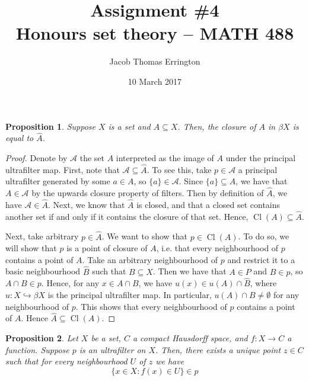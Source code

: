 \documentclass[11pt,letterpaper]{article}
\author{Jacob Thomas Errington}
\title{Assignment \#4\\Honours set theory -- MATH 488}
\date{10 March 2017}
\newtheorem{prop}{Proposition}
\newcommand{\parens}[1]{\left(#1\right)}
\newcommand{\intersn}{\cap}
\DeclareMathOperator{\closureOp}{Cl}
\newcommand{\closure}[1]{\closureOp{\parens{#1}}}
\newcommand{\embedsto}{\hookrightarrow}
\begin{document}
\maketitle

\begin{prop}
    Suppose $X$ is a set and $A \subseteq X$. Then, the closure of $A$ in
    $\beta X$ is equal to $\hat A$.
\end{prop}

\begin{proof}
    Denote by $\mathcal{A}$ the set $A$ interpreted as the image of $A$ under
    the principal ultrafilter map.
    First, note that $\mathcal{A} \subseteq \hat A$.
    To see this, take $p \in \mathcal{A}$ a principal ultrafilter generated by
    some $a \in A$, so $\{ a \} \in \mathcal{A}$. Since $\{a\} \subseteq A$, we
    have that $A \in \mathcal{A}$ by the upwards closure property of filters.
    Then by definition of $\hat A$, we have $\mathcal{A} \in \hat A$.
    Next, we know that $\hat A$ is closed, and that a closed set contains
    another set if and only if it contains the closure of that set.
    Hence, $\closure{A} \subseteq \hat A$.

    Next, take arbitrary $p \in \hat A$.
    We want to show that $p \in \closure{A}$.
    To do so, we will show that $p$ is a point of closure of $A$,
    i.e. that every neighbourhood of $p$ contains a point of $A$.
    Take an arbitrary neighbourhood of $p$ and restrict it to a basic
    neighbourhood $\hat B$ such that $B \subseteq X$.
    Then we have that $A \in P$ and $B \in p$, so $A \intersn B \in p$.
    Hence, for any $x \in A \intersn B$,
    we have $u(x) \in u(A) \intersn \hat B$,
    where $u : X \embedsto \beta X$ is the principal ultrafilter map.
    In particular, $u(A) \intersn B \neq \emptyset$ for any neighbourhood of
    $p$. This shows that every neighbourhood of $p$ contains a point of $A$.
    Hence $\hat A \subseteq \closure{A}$.
\end{proof}

\begin{prop}
    Let $X$ be a set, $C$ a compact Hausdorff space, and $f : X \to C$ a
    function. Suppose $p$ is an ultrafilter on $X$. Then, there exists a unique
    point $z \in C$ such that for every neighbourhood $U$ of $z$ we have
    \begin{equation*}
        \{ x \in X : f (x) \in U \} \in p
    \end{equation*}
\end{prop}
\end{document}
